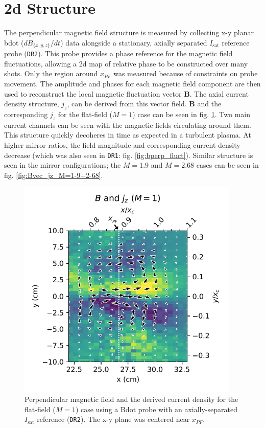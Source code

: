 \section{\label{sec:structure}2d Structure}
The perpendicular magnetic field structure is measured by collecting x-y planar bdot ($d B_{\{x, y, z \} } / dt$) data alongside a stationary, axially separated $I_\text{sat}$ reference probe (\texttt{DR2}). This probe provides a phase reference for the magnetic field fluctuations, allowing a 2d map of relative phase to be constructed over many shots. Only the region around $x_{PF}$ was measured because of constraints on probe movement. The amplitude and phases for each magnetic field component are then used to reconstruct the local magnetic fluctuation vector $\boldsymbol{B}$. The axial current density structure, $j_z$, can be derived from this vector field. $\boldsymbol{B}$ and the corresponding $j_z$ for the flat-field ($M=1$) case can be seen in fig. \ref{fig:Bvec_jz_M=1}.
Two main current channels can be seen with the magnetic fields circulating around them. This structure quickly decoheres in time as expected in a turbulent plasma. At higher mirror ratios, the field magnitude and corresponding current density decrease (which was also seen in \texttt{DR1}: fig. \ref{fig:bperp_fluct}). Similar structure is seen in the mirror configurations; the $M=1.9$ and $M=2.68$ cases can be seen in fig. \ref{fig:Bvec_jz_M=1-9+2-68}. 
\begin{figure}
    \centering
    \includegraphics[width=300pt]{figures/fig16.pdf}
    \caption[2d plane of the perpendicular magnetic field and the derived current density for $M=1$]{Perpendicular magnetic field and the derived current density for the flat-field ($M=1$) case using a Bdot probe with an axially-separated $I_\text{sat}$ reference (\texttt{DR2}). The x-y plane was centered near $x_{PF}$.}
    \label{fig:Bvec_jz_M=1}
\end{figure}

